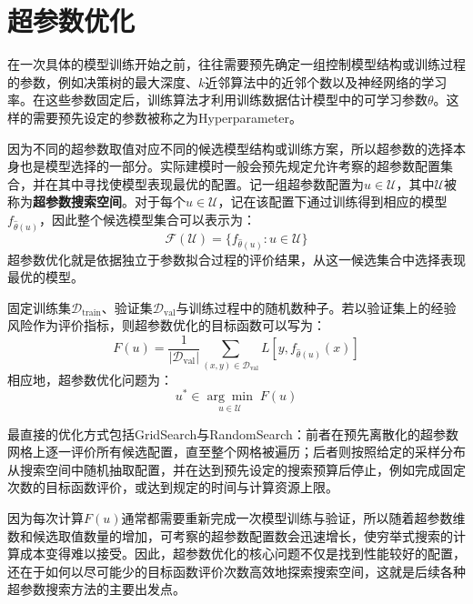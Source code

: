 \section{超参数优化}
在一次具体的模型训练开始之前，往往需要预先确定一组控制模型结构或训练过程的参数，例如决策树的最大深度、$k$近邻算法中的近邻个数以及神经网络的学习率。在这些参数固定后，训练算法才利用训练数据估计模型中的可学习参数$\theta$。这样的需要预先设定的参数被称之为\gls{Hyperparameter}。\par
因为不同的超参数取值对应不同的候选模型结构或训练方案，所以超参数的选择本身也是模型选择的一部分。实际建模时一般会预先规定允许考察的超参数配置集合，并在其中寻找使模型表现最优的配置。记一组超参数配置为$u\in\mathcal{U}$，其中$\mathcal{U}$被称为\textbf{超参数搜索空间}。对于每个$u\in\mathcal{U}$，记在该配置下通过训练得到相应的模型$f_{\hat{\theta}(u)}$，因此整个候选模型集合可以表示为：
\begin{equation*}
	\mathcal{F}(\mathcal{U})=\{f_{\hat{\theta}(u)}:u\in\mathcal{U}\}
\end{equation*}
超参数优化就是依据独立于参数拟合过程的评价结果，从这一候选集合中选择表现最优的模型。\par
固定训练集$\mathcal{D}_{\mathrm{train}}$、验证集$\mathcal{D}_{\mathrm{val}}$与训练过程中的随机数种子。若以验证集上的经验风险作为评价指标，则超参数优化的目标函数可以写为：
\begin{equation*}
	F(u)=\frac{1}{|\mathcal{D}_{\mathrm{val}}|}\sum_{(x,y)\in\mathcal{D}_{\mathrm{val}}}L[y,f_{\hat{\theta}(u)}(x)]
\end{equation*}
相应地，超参数优化问题为：
\begin{equation*}
	u^*\in\underset{u\in\mathcal{U}}{\arg\min}\;F(u)
\end{equation*}\par
最直接的优化方式包括\gls{GridSearch}与\gls{RandomSearch}：前者在预先离散化的超参数网格上逐一评价所有候选配置，直至整个网格被遍历；后者则按照给定的采样分布从搜索空间中随机抽取配置，并在达到预先设定的搜索预算后停止，例如完成固定次数的目标函数评价，或达到规定的时间与计算资源上限。\par
因为每次计算$F(u)$通常都需要重新完成一次模型训练与验证，所以随着超参数维数和候选取值数量的增加，可考察的超参数配置数会迅速增长，使穷举式搜索的计算成本变得难以接受。因此，超参数优化的核心问题不仅是找到性能较好的配置，还在于如何以尽可能少的目标函数评价次数高效地探索搜索空间，这就是后续各种超参数搜索方法的主要出发点。

